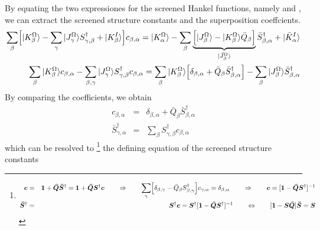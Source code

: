 \documentclass[11pt,a4paper]{report}
\begin{document}
By equating the two expressiones for the screened Hankel functions,
namely  and , we can
extract the screened structure constants and the superposition
coeffcients.
\begin{eqnarray}
\sum_\beta\Bigl[|K^\Omega_{\beta}\rangle
-\sum_{\gamma}|J^\Omega_{\gamma}\rangle S^\dagger_{\gamma,\beta}
+|K^I_{\beta}\rangle \Bigr]c_{\beta,\alpha}
=
|K^\Omega_{\alpha}\rangle
-\sum_{\beta}
\underbrace{\Bigl[|J^\Omega_{\beta}\rangle-|K^\Omega_{\beta}\rangle\bar{Q}_\beta\Bigr]}
_{|\bar{J}^\Omega_{\beta}\rangle} \bar{S}^\dagger_{\beta,\alpha}
+|\bar{K}^I_{\alpha}\rangle
\nonumber\\
\sum_\beta
|K^\Omega_{\beta}\rangle c_{\beta,\alpha}
-\sum_{\beta,\gamma}|J^\Omega_{\gamma}\rangle S^\dagger_{\gamma,\beta} c_{\beta,\alpha}
=
\sum_{\beta}|K^\Omega_{\beta}\rangle
\Bigl[\delta_{\beta,\alpha}+
\bar{Q}_\beta \bar{S}^\dagger_{\beta,\alpha}\Bigr]
-\sum_{\beta}|J^\Omega_{\beta}\rangle \bar{S}^\dagger_{\beta,\alpha}
\end{eqnarray}
By comparing the coefficients, we obtain
\begin{eqnarray}
c_{\beta,\alpha}&=&\delta_{\beta,\alpha}+
\bar{Q}_\beta \bar{S}^\dagger_{\beta,\alpha}
\label{eq:definingeqsystemforsbara}
\\
\bar{S}^\dagger_{\gamma,\alpha}&=&\sum_\beta S^\dagger_{\gamma,\beta} c_{\beta,\alpha}
\label{eq:definingeqsystemforsbar}
\label{eq:definingeqsystemforsbarb}
\end{eqnarray}
which can be resolved to
\footnote{
\begin{eqnarray}
\bm{c}&=&\bm{1}
+\bm{\bar{Q}}\bm{\bar{S}}^\dagger
=\bm{1}+\bm{\bar{Q}}\bm{S}^\dagger\bm{c}
\qquad
\Rightarrow\qquad\sum_\gamma \Bigl[\delta_{\beta,\gamma}
-\bar{Q}_\beta S^\dagger_{\beta,\gamma}\Bigr] c_{\gamma,\alpha}=\delta_{\beta,\alpha}
\qquad\Rightarrow\qquad
\bm{c}=[\bm{1}-\bm{\bar{Q}}\bm{S}^\dagger]^{-1}
\nonumber\\
\bm{\bar{S}}^\dagger&=&\bm{S}^\dagger\bm{c}
=\bm{S}^\dagger[\bm{1}-\bm{\bar{Q}}\bm{S}^\dagger]^{-1}
\qquad\Leftrightarrow\qquad
[\bm{1}-\bm{S}\bm{\bar{Q}}]\bm{\bar{S}}=\bm{S}
\end{eqnarray}
  } the defining
equation of the screened structure constants
\end{document}
